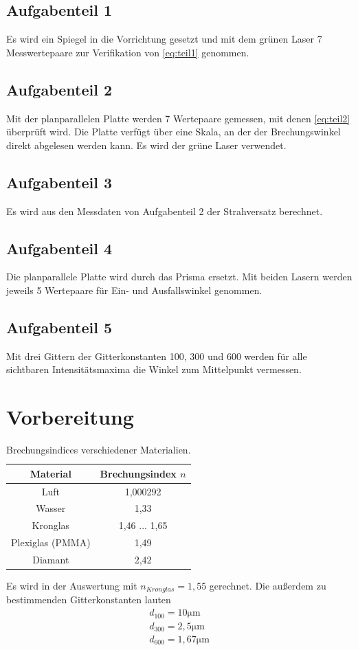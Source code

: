 \subsection*{Aufgabenteil 1}
Es wird ein Spiegel in die Vorrichtung gesetzt und mit dem grünen Laser 
7 Messwertepaare zur Verifikation von \autoref{eq:teil1} genommen.

\subsection*{Aufgabenteil 2}
Mit der planparallelen Platte werden 7 Wertepaare gemessen, mit denen \autoref{eq:teil2} 
überprüft wird. Die Platte verfügt über eine Skala, an der der 
Brechungswinkel direkt abgelesen werden kann. Es wird der grüne Laser verwendet.

\subsection*{Aufgabenteil 3}
Es wird aus den Messdaten von Aufgabenteil 2 der Strahversatz berechnet.

\subsection*{Aufgabenteil 4}
Die planparallele Platte wird durch das Prisma ersetzt. 
Mit beiden Lasern werden jeweils 5 Wertepaare für Ein- und Ausfallswinkel
genommen.

\subsection*{Aufgabenteil 5}
Mit drei Gittern der Gitterkonstanten 100, 300 und 600 werden für alle sichtbaren Intensitätsmaxima
die Winkel zum Mittelpunkt vermessen.

\section*{Vorbereitung}

\begin{table}[H]
	\centering
	\caption{Brechungsindices verschiedener Materialien. \cite{cosmos-indirekt}}
	\label{tab:brechungsindex}
	\begin{tabular}{c c}
		\toprule
		Material &
		Brechungsindex $n$ \\
		\midrule
		Luft 		& 1,000292 \\
		Wasser		& 1,33 \\
		Kronglas	& 1,46 ... 1,65 \\
		Plexiglas (PMMA) & 1,49 \\
		Diamant		& 2,42 \\
		\bottomrule
	\end{tabular}
\end{table}

Es wird in der Auswertung mit $n_{Kronglas} = 1,55$ gerechnet.
Die außerdem zu bestimmenden Gitterkonstanten lauten 
\begin{eqnarray}
    d_{100} = 10 \mathrm{\mu m} \nonumber \\
    d_{300} = 2,5 \mathrm{\mu m} \nonumber \\
    d_{600} = 1,67 \mathrm{\mu m} \nonumber 
\end{eqnarray}
